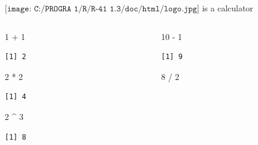 \documentclass[
  ignorenonframetext,
]{beamer}
\newenvironment{Shaded}{\begin{snugshade}}{\end{snugshade}}
\newcommand{\DecValTok}[1]{\textcolor[rgb]{0.00,0.00,0.81}{#1}}
\newcommand{\SpecialCharTok}[1]{\textcolor[rgb]{0.00,0.00,0.00}{#1}}
\begin{document}
\begin{frame}[fragile]{\(\texttt{[image: C:/PROGRA~1/R/R-41~1.3/doc/html/logo.jpg]}\)
is a calculator}
\protect\hypertarget{includegraphicsheight1emcprogra1rr-411.3dochtmllogo.jpg-is-a-calculator}{}
\begin{columns}[T,onlytextwidth]
\begin{column}{0.45\textwidth}
\begin{Shaded}
\begin{Highlighting}[]
\DecValTok{1} \SpecialCharTok{+} \DecValTok{1}
\end{Highlighting}
\end{Shaded}

\begin{verbatim}
[1] 2
\end{verbatim}

\begin{Shaded}
\begin{Highlighting}[]
\DecValTok{2} \SpecialCharTok{*} \DecValTok{2}
\end{Highlighting}
\end{Shaded}

\begin{verbatim}
[1] 4
\end{verbatim}

\begin{Shaded}
\begin{Highlighting}[]
\DecValTok{2} \SpecialCharTok{\^{}} \DecValTok{3}
\end{Highlighting}
\end{Shaded}

\begin{verbatim}
[1] 8
\end{verbatim}
\end{column}

\begin{column}{0.45\textwidth}
\begin{Shaded}
\begin{Highlighting}[]
\DecValTok{10} \SpecialCharTok{{-}} \DecValTok{1}
\end{Highlighting}
\end{Shaded}

\begin{verbatim}
[1] 9
\end{verbatim}

\begin{Shaded}
\begin{Highlighting}[]
\DecValTok{8} \SpecialCharTok{/} \DecValTok{2}
\end{Highlighting}
\end{Shaded}


\end{column}
\end{columns}
\end{frame}
\end{document}
